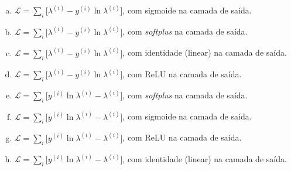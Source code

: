 \documentclass{dlproblemset}
\begin{document}
\begin{enumerate}[1)]
    \begin{enumerate}[(a)]
        \item $\mathcal{L} = \sum_{i}\bigl[\lambda^{(i)} - y^{(i)}\ln\lambda^{(i)}\bigr]$, com sigmoide na camada de saída.
        \item $\mathcal{L} = \sum_{i}\bigl[\lambda^{(i)} - y^{(i)}\ln\lambda^{(i)}\bigr]$, com \textit{softplus} na camada de saída.
        \item $\mathcal{L} = \sum_{i}\bigl[\lambda^{(i)} - y^{(i)}\ln\lambda^{(i)}\bigr]$, com identidade (linear) na camada de saída.
        \item $\mathcal{L} = \sum_{i}\bigl[\lambda^{(i)} - y^{(i)}\ln\lambda^{(i)}\bigr]$, com ReLU na camada de saída.
        \item $\mathcal{L} = \sum_{i}\bigl[y^{(i)}\ln\lambda^{(i)} - \lambda^{(i)}\bigr]$, com \textit{softplus} na camada de saída.
        \item $\mathcal{L} = \sum_{i}\bigl[y^{(i)}\ln\lambda^{(i)} - \lambda^{(i)}\bigr]$, com sigmoide na camada de saída.
        \item $\mathcal{L} = \sum_{i}\bigl[y^{(i)}\ln\lambda^{(i)} - \lambda^{(i)}\bigr]$, com ReLU na camada de saída.
        \item $\mathcal{L} = \sum_{i}\bigl[y^{(i)}\ln\lambda^{(i)} - \lambda^{(i)}\bigr]$, com identidade (linear) na camada de saída.
    \end{enumerate}

\end{enumerate}

\newpage
\end{document}
